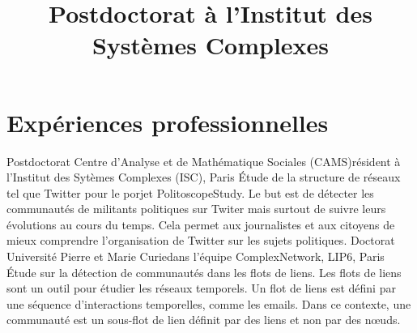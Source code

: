 \documentclass[11pt,a4paper]{moderncv}
\title{Postdoctorat à l'Institut des Systèmes Complexes}
\begin{document}
\maketitle
\vspace{-1.2cm}

\section{Expériences professionnelles}
 {Postdoctorat} {Centre d’Analyse et de Mathématique Sociales (CAMS)}{}{résident à l'Institut des Sytèmes Complexes (ISC), Paris}
{
	Étude de la structure de réseaux tel que Twitter pour le porjet PolitoscopeStudy. Le but est de détecter les communautés de militants politiques sur Twiter mais surtout de suivre leurs évolutions au cours du temps. Cela permet aux journalistes et aux citoyens de mieux comprendre l'organisation de Twitter sur les sujets politiques.
}
\vspace*{0.2cm}
 {Doctorat} {Université Pierre et Marie Curie}{}{dans l'équipe ComplexNetwork, LIP6, Paris}
{
 Étude sur la détection de communautés dans les flots de liens. Les flots de liens sont un outil pour étudier les réseaux temporels.
 Un flot de liens est défini par une séquence d'interactions temporelles, comme les emails. Dans ce contexte, une communauté est un sous-flot de lien définit par des liens et non par des n\oe uds.
}
\vspace*{0.2cm}
%
\vspace*{0.2cm}


\end{document}

